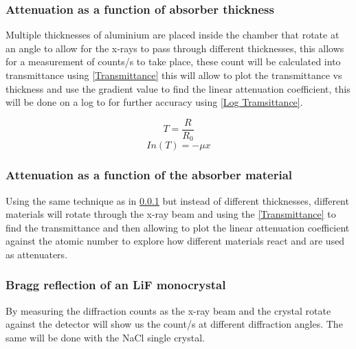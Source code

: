 \documentclass[12pt]{article}
\begin{document}
\subsubsection{Attenuation as a function of absorber thickness}
\label{Attenuation as a function of absorber thickness SubsubSection}

Multiple thicknesses of aluminium are placed inside the chamber that rotate at an angle to allow for the x-rays to pass through different thicknesses, this allows for a measurement of counts/s to take place, these count will be calculated into transmittance using \cref{Transmittance} this will allow to plot the transmittance vs thickness and use the gradient value to find the linear attenuation coefficient, this will be done on a log to for further accuracy using \cref{Log Tramsittance}.

\begin{equation}
T = \dfrac{R}{R_0}
\label{Transmittance}
\end{equation}
\begin{equation}
In(T)= -\mu x
\label{Log Tramsittance}
\end{equation}

\subsubsection{Attenuation as a function of the absorber material}
\label{Attenuation as a function of the absorber material SubsubSection}

Using the same technique as in \cref{Attenuation as a function of absorber thickness SubsubSection} but instead of different thicknesses, different materials will rotate through the x-ray beam and using the \cref{Transmittance} to find the transmittance and then allowing to plot the linear attenuation coefficient against the atomic number to explore how different materials react and are used as attenuaters.

\subsubsection{Bragg reflection of an LiF monocrystal}
\label{Bragg reflection of an LiF monocrystal SusubSection}

By measuring the diffraction counts as the x-ray beam and the crystal rotate against the detector will show us the count/s at different diffraction angles. The same will be done with the NaCl single crystal.
\end{document}
